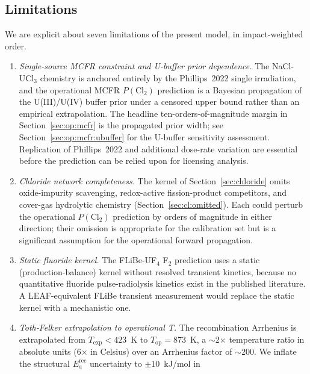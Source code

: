 \documentclass[11pt]{article}
\theoremstyle{plain}
\theoremstyle{definition}
\theoremstyle{remark}
\newcommand{\Ea}{E_a}
\begin{document}
\subsection{Limitations}\label{sec:lim}

We are explicit about seven limitations of the present model, in
impact-weighted order.

\begin{sloppypar}
\begin{enumerate}
\item \emph{Single-source MCFR constraint and U-buffer prior dependence.}
      The NaCl-UCl$_3$ chemistry is anchored entirely by the
      Phillips~2022 single irradiation, and the operational MCFR
      $P(\mathrm{Cl}_2)$ prediction is a Bayesian propagation of the
      U(III)/U(IV) buffer prior under a censored upper bound rather than
      an empirical extrapolation.  The headline ten-orders-of-magnitude
      margin in Section~\ref{sec:op:mcfr} is the propagated prior width;
      see Section~\ref{sec:op:mcfr:ubuffer} for the U-buffer sensitivity
      assessment.  Replication of Phillips~2022 and additional dose-rate
      variation are essential before the prediction can be relied upon
      for licensing analysis.
\item \emph{Chloride network completeness.}  The kernel of
      Section~\ref{sec:chloride} omits oxide-impurity scavenging,
      redox-active fission-product competitors, and cover-gas hydrolytic
      chemistry (Section~\ref{sec:cl:omitted}).  Each could perturb the
      operational $P(\mathrm{Cl}_2)$ prediction by orders of magnitude
      in either direction; their omission is appropriate for the
      calibration set but is a significant assumption for the operational
      forward propagation.
\item \emph{Static fluoride kernel.}  The FLiBe-UF$_4$ F$_2$ prediction uses
      a static (production-balance) kernel without resolved transient
      kinetics, because no quantitative fluoride pulse-radiolysis kinetics
      exist in the published literature.  A LEAF-equivalent FLiBe transient
      measurement would replace the static kernel with a mechanistic one.
\item \emph{Toth-Felker extrapolation to operational T.}  The
      recombination Arrhenius is extrapolated from
      $T_{\mathrm{exp}}<423$~K to $T_{\mathrm{op}}=873$~K, a
      $\sim$2$\times$ temperature ratio in absolute units (6$\times$ in
      Celsius) over an Arrhenius factor of $\sim 200$.  We inflate the
      structural $\Ea^{\mathrm{rec}}$ uncertainty to $\pm 10$~kJ/mol in

\end{enumerate}
\end{sloppypar}
\end{document}
